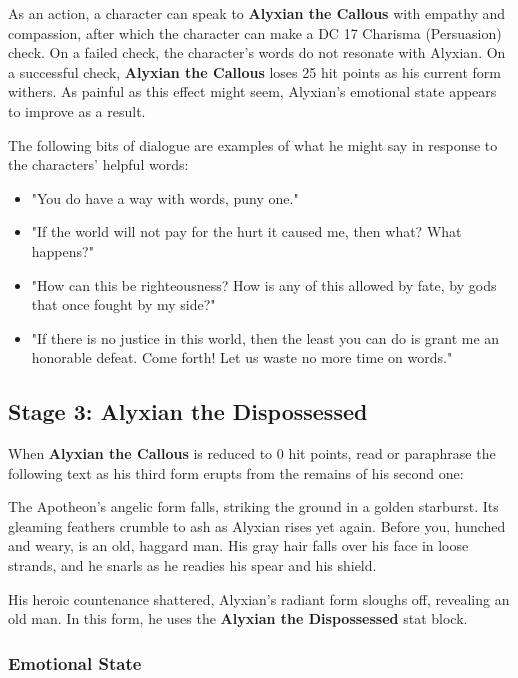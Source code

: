 \documentclass[a4paper, 11pt, bg=full, twocolumn, nooutline]{dndbook}
\begin{document}
As an action, a character can speak to \textbf{Alyxian the Callous} with empathy and compassion, after which the character can make a DC 17 Charisma (Persuasion) check. On a failed check, the character's words do not resonate with Alyxian. On a successful check, \textbf{Alyxian the Callous} loses 25 hit points as his current form withers. As painful as this effect might seem, Alyxian's emotional state appears to improve as a result.

The following bits of dialogue are examples of what he might say in response to the characters' helpful words:

\begin{itemize}
\item "You do have a way with words, puny one."
\item "If the world will not pay for the hurt it caused me, then what? What happens?"
\item "How can this be righteousness? How is any of this allowed by fate, by gods that once fought by my side?"
\item "If there is no justice in this world, then the least you can do is grant me an honorable defeat. Come forth! Let us waste no more time on words."
\end{itemize}

\subsection{Stage 3: Alyxian the Dispossessed}

When \textbf{Alyxian the Callous} is reduced to 0 hit points, read or paraphrase the following text as his third form erupts from the remains of his second one:

\begin{DndReadAloud}
The Apotheon's angelic form falls, striking the ground in a golden starburst. Its gleaming feathers crumble to ash as Alyxian rises yet again. Before you, hunched and weary, is an old, haggard man. His gray hair falls over his face in loose strands, and he snarls as he readies his spear and his shield.
\end{DndReadAloud}

His heroic countenance shattered, Alyxian's radiant form sloughs off, revealing an old man. In this form, he uses the \textbf{Alyxian the Dispossessed} stat block.


\subsubsection{Emotional State}
\end{document}
